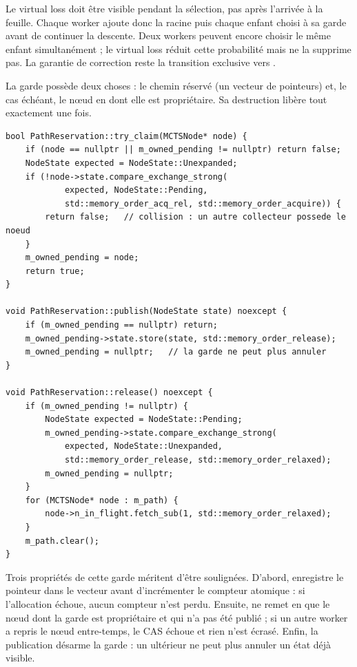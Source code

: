 Le virtual loss doit \^etre visible pendant la s\'election, pas apr\`es
l'arriv\'ee \`a la feuille. Chaque worker ajoute donc la racine puis chaque
enfant choisi \`a sa garde  avant de continuer la
descente. Deux workers peuvent encore choisir le m\^eme enfant
simultan\'ement ; le virtual loss r\'eduit cette probabilit\'e mais ne la
supprime pas. La garantie de correction reste la transition exclusive vers
.

La garde poss\`ede deux choses : le chemin r\'eserv\'e (un vecteur de
pointeurs) et, le cas \'ech\'eant, le n\oe{}ud en  dont elle est
propri\'etaire. Sa destruction lib\`ere tout exactement une fois.

\begin{lstlisting}[caption={La r\'eservation, coeur de la garde RAII. La
r\'eservation enregistre le pointeur avant d'incr\'ementer le compteur, de
sorte qu'une allocation rat\'ee ne perd aucun compteur. La publication
d\'esarme la propri\'et\'e avant de pouvoir annuler un \'etat publi\'e.},
label={lst:reservation}]
bool PathReservation::try_claim(MCTSNode* node) {
    if (node == nullptr || m_owned_pending != nullptr) return false;
    NodeState expected = NodeState::Unexpanded;
    if (!node->state.compare_exchange_strong(
            expected, NodeState::Pending,
            std::memory_order_acq_rel, std::memory_order_acquire)) {
        return false;   // collision : un autre collecteur possede le noeud
    }
    m_owned_pending = node;
    return true;
}

void PathReservation::publish(NodeState state) noexcept {
    if (m_owned_pending == nullptr) return;
    m_owned_pending->state.store(state, std::memory_order_release);
    m_owned_pending = nullptr;   // la garde ne peut plus annuler
}

void PathReservation::release() noexcept {
    if (m_owned_pending != nullptr) {
        NodeState expected = NodeState::Pending;
        m_owned_pending->state.compare_exchange_strong(
            expected, NodeState::Unexpanded,
            std::memory_order_release, std::memory_order_relaxed);
        m_owned_pending = nullptr;
    }
    for (MCTSNode* node : m_path) {
        node->n_in_flight.fetch_sub(1, std::memory_order_relaxed);
    }
    m_path.clear();
}
\end{lstlisting}

Trois propri\'et\'es de cette garde m\'eritent d'\^etre soulign\'ees. D'abord,
 enregistre le pointeur dans le vecteur avant d'incr\'ementer
le compteur atomique : si l'allocation \'echoue, aucun compteur n'est perdu.
Ensuite,  ne remet en  que le n\oe{}ud dont
la garde est propri\'etaire et qui n'a pas \'et\'e publi\'e ; si un autre
worker a repris le n\oe{}ud entre-temps, le CAS \'echoue et rien n'est
\'ecras\'e. Enfin, la publication d\'esarme la garde : un 
ult\'erieur ne peut plus annuler un \'etat d\'ej\`a visible.

